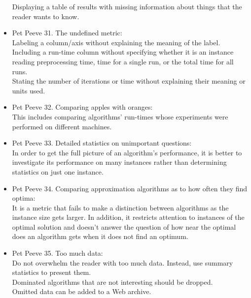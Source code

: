 \documentclass[]{scrartcl}
\begin{document}
\begin{itemize}
	Displaying a table of results with missing information about things that the reader wants to know.
	\item Pet Peeve 31. The undefined metric: \\
	Labeling a column/axis without explaining the meaning of the label. \\ Including a run-time column without specifying whether it is an instance reading preprocessing time, time for a single run, or the total time for all runs. \\ Stating the number of iterations or time without explaining their meaning or units used.
	\item Pet Peeve 32. Comparing apples with oranges: \\
	This includes comparing algorithms' run-times whose experiments were performed on different machines.
	\item Pet Peeve 33. Detailed statistics on unimportant questions: \\
	In order to get the full picture of an algorithm's performance, it is better to investigate its performance on many instances rather than determining statistics on just one instance.
	\item Pet Peeve 34. Comparing approximation algorithms as to how often they find optima: \\
	It is a metric that fails to make a distinction between algorithms as the instance size gets larger. In addition, it restricts attention to instances of the optimal solution and doesn't answer the question of how near the optimal does an algorithm gets when it does not find an optimum.
	\item Pet Peeve 35. Too much data: \\
	Do not overwhelm the reader with too much data. Instead, use summary statistics to present them. \\ Dominated algorithms that are not interesting should be dropped. \\ Omitted data can be added to a Web archive.
\end{itemize}
\end{document}
